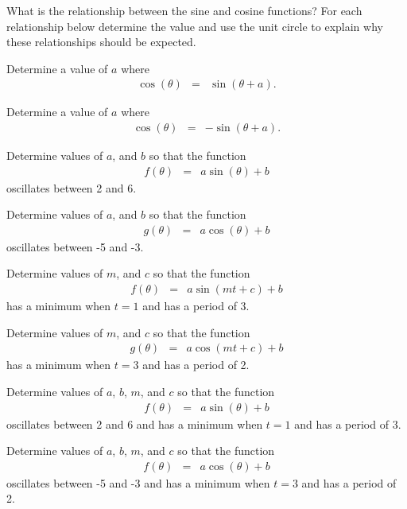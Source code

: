 \begin{problem}
\item What is the relationship between the sine and cosine functions?
  For each relationship below determine the value and use the unit
  circle to explain why these relationships should be expected.
  \begin{subproblem}
  \item Determine a value of $a$ where
    \begin{eqnarray*}
      \cos(\theta) & = & \sin(\theta+a).
    \end{eqnarray*}
    \vfill
  \item Determine a value of $a$ where
    \begin{eqnarray*}
      \cos(\theta) & = & -\sin(\theta+a).
    \end{eqnarray*}
    \vfill
  \end{subproblem}
    \clearpage

  \item Determine values of $a$, and $b$ so that the function
    \begin{eqnarray*}
      f(\theta) & = & a\sin(\theta)+b
    \end{eqnarray*}
    oscillates between 2 and 6.
    \vfill

  \item Determine values of $a$, and $b$ so that the function
    \begin{eqnarray*}
      g(\theta) & = & a\cos(\theta)+b
    \end{eqnarray*}
    oscillates between -5 and -3.
    \vfill

\clearpage

\item Determine values of $m$, and $c$ so that the function
  \begin{eqnarray*}
    f(\theta) & = & a\sin(mt+c)+b
  \end{eqnarray*}
  has a minimum when $t=1$ and has a period of 3.
  \vfill

\item Determine values of $m$, and $c$ so that the function
  \begin{eqnarray*}
    g(\theta) & = & a\cos(mt+c)+b
  \end{eqnarray*}
  has a minimum when $t=3$ and has a period of 2.
  \vfill

\clearpage

\item Determine values of $a$, $b$, $m$, and $c$ so that the function
  \begin{eqnarray*}
    f(\theta) & = & a\sin(\theta)+b
  \end{eqnarray*}
  oscillates between 2 and 6 and has a minimum when $t=1$ and has a period of 3.
  \vfill

\item Determine values of $a$, $b$, $m$, and $c$ so that the function
  \begin{eqnarray*}
    f(\theta) & = & a\cos(\theta)+b
  \end{eqnarray*}
  oscillates between -5 and -3 and has a minimum when $t=3$ and has a period of 2.
  \vfill

\end{problem}

